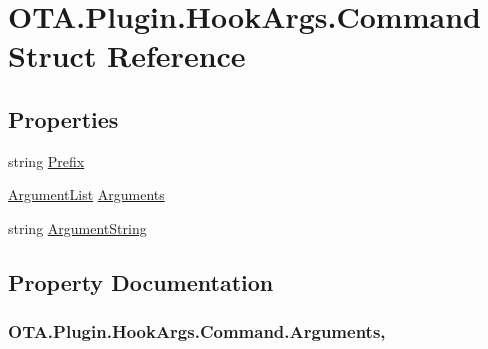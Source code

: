 \hypertarget{struct_o_t_a_1_1_plugin_1_1_hook_args_1_1_command}{}\section{O\+T\+A.\+Plugin.\+Hook\+Args.\+Command Struct Reference}
\label{struct_o_t_a_1_1_plugin_1_1_hook_args_1_1_command}
\subsection*{Properties}
\begin{DoxyCompactItemize}
\item 
string \hyperlink{struct_o_t_a_1_1_plugin_1_1_hook_args_1_1_command_a445a364f6d5e4c28a620abf4485392ec}{Prefix}
\item 
\hyperlink{class_o_t_a_1_1_command_1_1_argument_list}{Argument\+List} \hyperlink{struct_o_t_a_1_1_plugin_1_1_hook_args_1_1_command_a96307bb0ba1e6010b13e4ccc0ab776d8}{Arguments}
\item 
string \hyperlink{struct_o_t_a_1_1_plugin_1_1_hook_args_1_1_command_ac7a67cf17520394b2dd4faea387fe55f}{Argument\+String}
\end{DoxyCompactItemize}


\subsection{Property Documentation}
\hypertarget{struct_o_t_a_1_1_plugin_1_1_hook_args_1_1_command_a96307bb0ba1e6010b13e4ccc0ab776d8}{}
\subsubsection[{Arguments}]{ O\+T\+A.\+Plugin.\+Hook\+Args.\+Command.\+Arguments\hspace{0.3cm}{\ttfamily [get]}, {\ttfamily [set]}}\label{struct_o_t_a_1_1_plugin_1_1_hook_args_1_1_command_a96307bb0ba1e6010b13e4ccc0ab776d8}
\hypertarget{struct_o_t_a_1_1_plugin_1_1_hook_args_1_1_command_ac7a67cf17520394b2dd4faea387fe55f}{}
